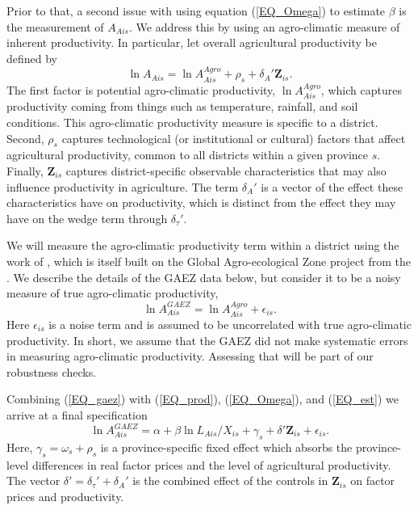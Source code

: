 Prior to that, a second issue with using equation (\ref{EQ_Omega}) to estimate $\beta$ is the measurement of $A_{Ais}$. We address this by using an agro-climatic measure of inherent productivity. In particular, let overall agricultural productivity be defined by 
\begin{equation}
	\ln A_{Ais} = \ln A_{Ais}^{Agro} + \rho_s + \delta_{A}' \mathbf{Z}_{is}. \label{EQ_prod}
\end{equation}
The first factor is potential agro-climatic productivity, $\ln A_{Ais}^{Agro}$, which captures productivity coming from things such as temperature, rainfall, and soil conditions. This agro-climatic productivity measure is specific to a district. Second, $\rho_s$ captures technological (or institutional or cultural) factors that affect agricultural productivity, common to all districts within a given province $s$. Finally, $\mathbf{Z}_{is}$ captures district-specific observable characteristics that may also influence productivity in agriculture. The term $\delta_{A}'$ is a vector of the effect these characteristics have on productivity, which is distinct from the effect they may have on the wedge term through $\delta_{\tau}'$.

We will measure the agro-climatic productivity term within a district using the work of \cite{galorozak2016}, which is itself built on the Global Agro-ecological Zone project from the \cite{gaez}. We describe the details of the GAEZ data below, but consider it to be a noisy measure of true agro-climatic productivity,
\begin{equation}
	\ln A_{Ais}^{GAEZ} = \ln A_{Ais}^{Agro} + \epsilon_{is}. \label{EQ_gaez}
\end{equation}
Here $\epsilon_{is}$ is a noise term and is assumed to be uncorrelated with true agro-climatic productivity. In short, we assume that the GAEZ did not make systematic errors in measuring agro-climatic productivity. Assessing that will be part of our robustness checks.

Combining (\ref{EQ_gaez}) with (\ref{EQ_prod}), (\ref{EQ_Omega}), and (\ref{EQ_est}) we arrive at a final specification
\begin{equation}
	\ln A^{GAEZ}_{Ais} = \alpha + \beta \ln L_{Ais}/X_{is} + \gamma_{s} + \delta' \mathbf{Z}_{is} + \epsilon_{is}. \label{EQ_regress}
\end{equation}
Here, $\gamma_s = \omega_s + \rho_s$ is a province-specific fixed effect which absorbs the province-level differences in real factor prices and the level of agricultural productivity. The vector $\delta' = \delta_{\tau}' + \delta_{A}'$ is the combined effect of the controls in $\mathbf{Z}_{is}$ on factor prices and productivity.

